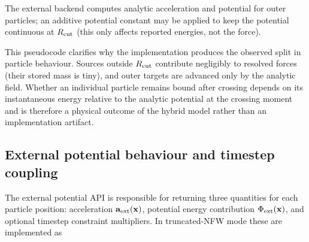 \begin{enumerate}
The external backend computes analytic acceleration and potential for outer particles; an additive potential constant may be applied to keep the potential continuous at $R_{\rm cut}$ (this only affects reported energies, not the force).

\end{enumerate}

This pseudocode clarifies why the implementation produces the observed split in particle behaviour. Sources outside $R_{\rm cut}$ contribute negligibly to resolved forces (their stored mass is tiny), and outer targets are advanced only by the analytic field. Whether an individual particle remains bound after crossing depends on its instantaneous energy relative to the analytic potential at the crossing moment and is therefore a physical outcome of the hybrid model rather than an implementation artifact.

\subsection{External potential behaviour and timestep coupling}

The external potential API is responsible for returning three quantities for each particle position: acceleration \(\mathbf{a}_{\rm ext}(\mathbf{x})\), potential energy contribution \(\Phi_{\rm ext}(\mathbf{x})\), and optional timestep constraint multipliers. In truncated-NFW mode these are implemented as

